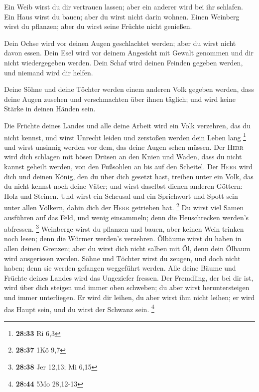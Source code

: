  Ein Weib wirst du dir vertrauen lassen; aber ein anderer
wird bei ihr schlafen. Ein Haus wirst du bauen; aber du wirst nicht
darin wohnen. Einen Weinberg wirst du pflanzen; aber du wirst seine
Früchte nicht genießen.

 Dein Ochse wird vor deinen Augen geschlachtet werden;
aber du wirst nicht davon essen. Dein Esel wird vor deinem Angesicht mit
Gewalt genommen und dir nicht wiedergegeben werden. Dein Schaf wird
deinen Feinden gegeben werden, und niemand wird dir helfen.

 Deine Söhne und deine Töchter werden einem anderen Volk
gegeben werden, dass deine Augen zusehen und verschmachten über ihnen
täglich; und wird keine Stärke in deinen Händen sein.

 Die Früchte deines Landes und alle deine Arbeit wird ein
Volk verzehren, das du nicht kennst, und wirst Unrecht leiden und
zerstoßen werden dein Leben lang \footnote{\textbf{28:33} Ri 6,3}
 und wirst unsinnig werden vor dem, das deine Augen sehen
müssen.  Der \textsc{Herr} wird dich schlagen mit bösen
Drüsen an den Knien und Waden, dass du nicht kannst geheilt werden, von
den Fußsohlen an bis auf den Scheitel.  Der \textsc{Herr}
wird dich und deinen König, den du über dich gesetzt hast, treiben unter
ein Volk, das du nicht kennst noch deine Väter; und wirst daselbst
dienen anderen Göttern: Holz und Steinen.  Und wirst ein
Scheusal und ein Sprichwort und Spott sein unter allen Völkern, dahin
dich der \textsc{Herr} getrieben hat. \footnote{\textbf{28:37} 1Kö 9,7}
 Du wirst viel Samen ausführen auf das Feld, und wenig
einsammeln; denn die Heuschrecken werden's abfressen. \footnote{\textbf{28:38}
  Jer 12,13; Mi 6,15}  Weinberge wirst du pflanzen und
bauen, aber keinen Wein trinken noch lesen; denn die Würmer werden's
verzehren.  Ölbäume wirst du haben in allen deinen
Grenzen; aber du wirst dich nicht salben mit Öl, denn dein Ölbaum wird
ausgerissen werden.  Söhne und Töchter wirst du zeugen,
und doch nicht haben; denn sie werden gefangen weggeführt werden.
 Alle deine Bäume und Früchte deines Landes wird das
Ungeziefer fressen.  Der Fremdling, der bei dir ist, wird
über dich steigen und immer oben schweben; du aber wirst heruntersteigen
und immer unterliegen.  Er wird dir leihen, du aber wirst
ihm nicht leihen; er wird das Haupt sein, und du wirst der Schwanz sein.
\footnote{\textbf{28:44} 5Mo 28,12-13}

